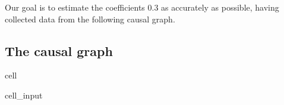 \documentclass[letterpaper,10pt,english]{jupyterBook}
\begin{document}
\sphinxAtStartPar
Our goal is to estimate the coefficients \sphinxhyphen{}0.3 as accurately as possible, having collected data from the following causal graph.


\subsection{The causal graph}
\label{\detokenize{notebooks/double_machine_learning:the-causal-graph}}
\begin{sphinxuseclass}{cell}\begin{sphinxVerbatimInput}

\begin{sphinxuseclass}{cell_input}
\begin{sphinxVerbatim}[commandchars=\\\{\}]
 
   

  


\end{sphinxVerbatim}
\end{sphinxuseclass}
\end{sphinxVerbatimInput}
\end{sphinxuseclass}
\end{document}
